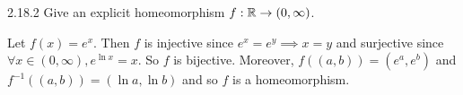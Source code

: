 \begin{ex}{2.18.2}
    Give an explicit homeomorphism $f:\mathbb{R}\to(0,\infty)$.
\end{ex}
\begin{sol}
    Let $f(x)=e^x$. Then $f$ is injective since $e^x=e^y\implies x=y$ and surjective since $\forall x\in(0,\infty), e^{\ln x}=x$. So $f$ is bijective.
    Moreover, $f((a,b))=\left(e^a,e^b\right)$ and $f^{-1}((a,b))=(\ln a, \ln b)$ and so $f$ is a homeomorphism.
\end{sol}
